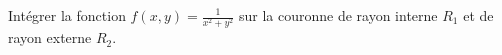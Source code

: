 
\begin{exercice}\label{exoOutilsMath-0092}

    Intégrer la fonction $f(x,y)=\frac{1}{ x^2+y^2 }$ sur la couronne de rayon interne $R_1$ et de rayon externe $R_2$.



\end{exercice}
